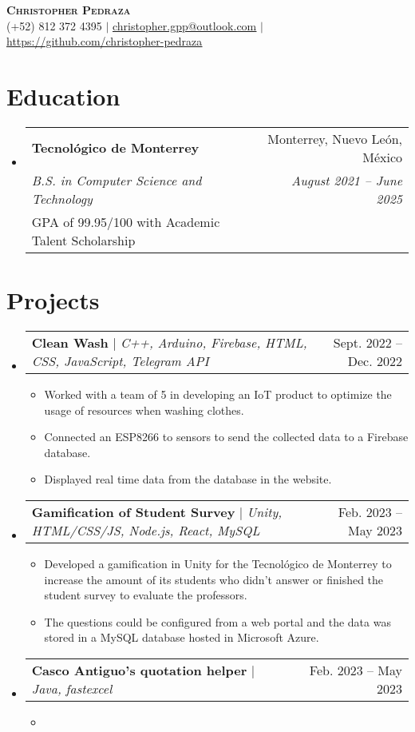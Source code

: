 \documentclass[letterpaper,11pt]{article}
\makeatletter
\newcommand{\resumeItem}[1]{
  \item\small{
    {#1 \vspace{-2pt}}
  }
}
\newcommand{\resumeSubheading}[5]{
  \vspace{-2pt}\item
    \begin{tabular*}{0.97\textwidth}[t]{l@{\extracolsep{\fill}}r}
      \textbf{#1} & #2 \\
      \textit{\small#3} & \textit{\small #4} \\
      {#5} \\
    \end{tabular*}\vspace{-7pt}
}
\newcommand{\resumeProjectHeading}[2]{
    \item
    \begin{tabular*}{0.97\textwidth}{l@{\extracolsep{\fill}}r}
      \small#1 & #2 \\
    \end{tabular*}\vspace{-7pt}
}
\newcommand{\resumeSubHeadingListStart}{\begin{itemize}[leftmargin=0.15in, label={}]}
\newcommand{\resumeSubHeadingListEnd}{\end{itemize}}
\newcommand{\resumeItemListStart}{\begin{itemize}}
\newcommand{\resumeItemListEnd}{\end{itemize}\vspace{-5pt}}
\makeatother
\begin{document}

\begin{center}
    \textbf{\Huge \scshape Christopher Pedraza} \\ \vspace{1pt}
    \small (+52) 812 372 4395 $|$ \href{mailto:christopher.gpp@outlook.com}{\underline{christopher.gpp@outlook.com}} $|$ 
    \href{https://github.com/christopher-pedraza}{\underline{https://github.com/christopher-pedraza}}
\end{center}


\section{Education}
  \resumeSubHeadingListStart
    \resumeSubheading
      {Tecnológico de Monterrey}{Monterrey, Nuevo León, México}
      {B.S. in Computer Science and Technology}{August 2021 -- June 2025}
      {GPA of 99.95/100 with Academic Talent Scholarship}
  \resumeSubHeadingListEnd


\section{Projects}
    \resumeSubHeadingListStart
      \resumeProjectHeading
          {\textbf{Clean Wash} $|$ \emph{C++, Arduino, Firebase, HTML, CSS, JavaScript, Telegram API}}{Sept. 2022 -- Dec. 2022}
          \resumeItemListStart
            \resumeItem{Worked with a team of 5 in developing an IoT product to optimize the usage of resources when washing clothes.}
            \resumeItem{Connected an ESP8266 to sensors to send the collected data to a Firebase database.}
            \resumeItem{Displayed real time data from the database in the website.}
          \resumeItemListEnd
      \resumeProjectHeading
          {\textbf{Gamification of Student Survey} $|$ \emph{Unity, HTML/CSS/JS, Node.js, React, MySQL}}{Feb. 2023 -- May 2023}
          \resumeItemListStart
            \resumeItem{Developed a gamification in Unity for the Tecnológico de Monterrey to increase the amount of its students who didn't answer or finished the student survey to evaluate the professors.}
            \resumeItem{The questions could be configured from a web portal and the data was stored in a MySQL database hosted in Microsoft Azure.}
          \resumeItemListEnd
      \resumeProjectHeading
          {\textbf{Casco Antiguo's quotation helper} $|$ \emph{Java, fastexcel}}{Feb. 2023 -- May 2023}
          \resumeItemListStart
            \resumeItem{}
          \resumeItemListEnd
    \resumeSubHeadingListEnd
\end{document}
